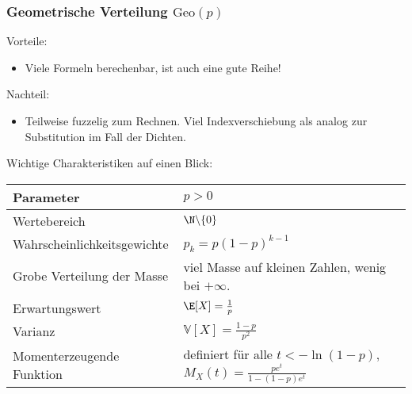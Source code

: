 \subsubsection*{Geometrische Verteilung $\text{Geo}(p)$}

{Vorteile:} 
\begin{itemize}
	\item Viele Formeln berechenbar, ist auch eine gute Reihe!
\end{itemize}

Nachteil:
\begin{itemize}
	\item Teilweise fuzzelig zum Rechnen. Viel Indexverschiebung als analog zur Substitution im Fall der Dichten.
\end{itemize}


Wichtige Charakteristiken auf einen Blick:
\begin{center}
\begin{tabular}[h]{|l|l|}
\hline
Parameter& $p>0$ \\
\hline
Wertebereich & $\N\backslash \{0\}$\\
\hline
Wahrscheinlichkeitsgewichte& $p_k=p(1-p)^{k-1}$\\
\hline
Grobe Verteilung der Masse & viel Masse auf kleinen Zahlen, wenig bei $+\infty$.\\
\hline
Erwartungswert& $\E[X]=\frac 1 p$ \\
\hline
Varianz & $\mathbb V[X]=\frac{1-p}{p^2}$\\
\hline
Momenterzeugende Funktion& definiert f\"ur alle $t<-\ln(1-p)$, $M_X(t)=\frac{pe^t}{1-(1-p)e^t}$\\
\hline
\end{tabular}
\end{center}

